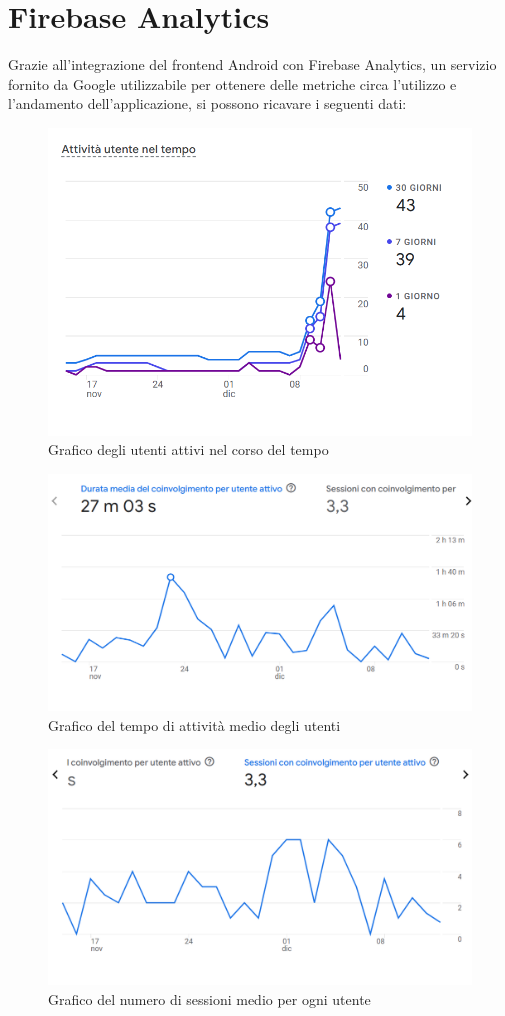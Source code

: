    \section{Firebase Analytics}
        Grazie all'integrazione del frontend Android con Firebase Analytics, un servizio fornito da Google utilizzabile per ottenere delle metriche circa l'utilizzo e l'andamento dell'applicazione, si possono ricavare i seguenti dati:
        \begin{figure}[htbp!]
            \centering
            \includegraphics[width=0.5\linewidth]{Immagini/Validazione Software/UtentiAttivi.png}
            \caption{Grafico degli utenti attivi nel corso del tempo}
        \end{figure}
        \begin{figure}[htbp!]
            \centering
            \includegraphics[width=0.5\linewidth]{Immagini/Validazione Software/CoinvolgimentoUtenti.png}
            \caption{Grafico del tempo di attività medio degli utenti}
        \end{figure}
        \begin{figure}[htbp!]
            \centering
            \includegraphics[width=0.5\linewidth]{Immagini/Validazione Software/SessioniUtenti.png}
            \caption{Grafico del numero di sessioni medio per ogni utente}
        \end{figure}